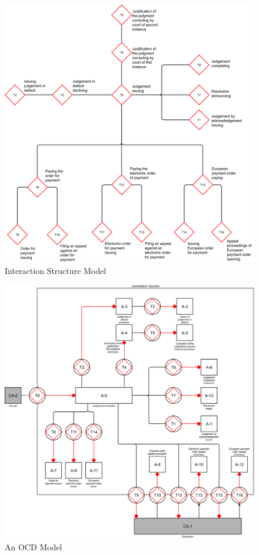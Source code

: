 \begin{figure}[h]\centering
	\includegraphics[width=\textwidth]{pic/tree}
	\caption{Interaction Structure Model}
	\label{fig:interactionStructure}
\end{figure}

\begin{figure}[h]\centering
	\includegraphics[width=\textwidth]{pic/ocd}
	\caption{An OCD Model}
	\label{fig:csdModel}
\end{figure}

